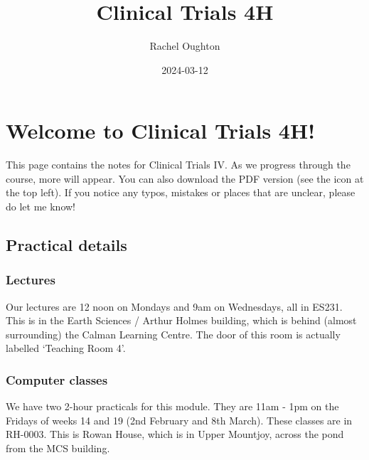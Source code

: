 \documentclass[
  openany]{book}
\title{Clinical Trials 4H}
\author{Rachel Oughton}
\date{2024-03-12}
\theoremstyle{definition}
\theoremstyle{definition}
\theoremstyle{definition}
\theoremstyle{definition}
\theoremstyle{remark}
\begin{document}
\maketitle

{
\setcounter{tocdepth}{1}
\tableofcontents
}
\hypertarget{welcome-to-clinical-trials-4h}{%
\chapter*{Welcome to Clinical Trials 4H!}\label{welcome-to-clinical-trials-4h}}

This page contains the notes for Clinical Trials IV. As we progress through the course, more will appear. You can also download the PDF version (see the icon at the top left). If you notice any typos, mistakes or places that are unclear, please do let me know!

\hypertarget{practical-details}{%
\section*{Practical details}\label{practical-details}}

\hypertarget{lectures}{%
\subsection*{Lectures}\label{lectures}}

Our lectures are 12 noon on Mondays and 9am on Wednesdays, all in ES231. This is in the Earth Sciences / Arthur Holmes building, which is behind (almost surrounding) the Calman Learning Centre. The door of this room is actually labelled `Teaching Room 4'.

\hypertarget{computer-classes}{%
\subsection*{Computer classes}\label{computer-classes}}

We have two 2-hour practicals for this module. They are 11am - 1pm on the Fridays of weeks 14 and 19 (2nd February and 8th March). These classes are in RH-0003. This is Rowan House, which is in Upper Mountjoy, across the pond from the MCS building.
\end{document}
